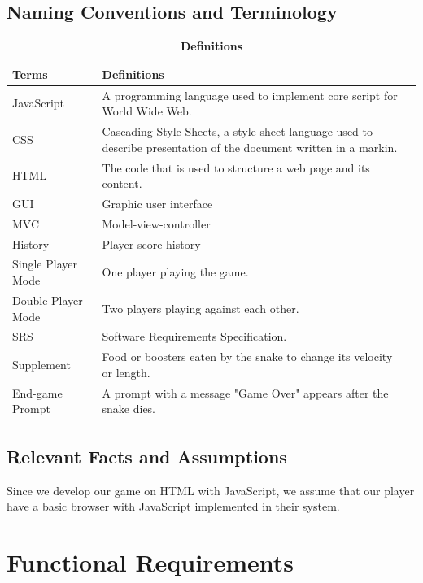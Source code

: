\documentclass[12pt, titlepage]{article}
\begin{document}
\subsection{Naming Conventions and Terminology}
\begin{table}[!htbp]
\caption{\bf Definitions}
\begin{tabularx}{\textwidth}{p{4cm}p{9cm}X}
\toprule {\bf Terms} & {\bf Definitions}\\
\midrule
JavaScript &  A programming language used to implement core script for World Wide Web.\\
CSS & Cascading Style Sheets, a style sheet language used to describe presentation of the document written in a markin.\\
HTML & The code that is used to structure a web page and its content.\\
GUI & Graphic user interface\\
MVC  & Model-view-controller\\
History & Player score history\\
Single Player Mode & One player playing the game.\\
Double Player Mode & Two players playing against each other.\\
SRS & Software Requirements Specification.\\
Supplement & Food or boosters eaten by the snake to change its velocity or length.\\
End-game Prompt & A prompt with a message "Game Over" appears after the snake dies.\\
\bottomrule
\end{tabularx}
\end{table}

\newpage

\subsection{Relevant Facts and Assumptions}

Since we develop our game on HTML with JavaScript, we assume that our player have a basic browser with JavaScript implemented in their system. 

\section{Functional Requirements}
\end{document}
